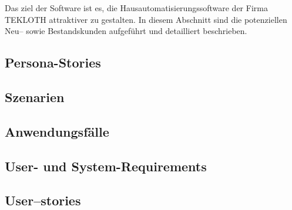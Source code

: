 Das ziel der Software ist es, die Hausautomatisierungssoftware der Firma TEKLOTH attraktiver zu gestalten.
In diesem Abschnitt sind die potenziellen Neu-- sowie Bestandskunden aufgeführt und detailliert beschrieben.

\subsection{Persona-Stories}\label{subsec:persona-stories}
    


\subsection{Szenarien}\label{subsec:szenarien}
    


\subsection{Anwendungsfälle}\label{subsec:anwendungsfaelle}
    


\subsection{User- und System-Requirements}\label{subsec:user-and-system-requirements}
    


\subsection{User--stories}\label{subsec:user-stories}
    